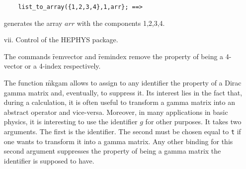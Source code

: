\begin{itemize}
\begin{verbatim}
    list_to_array({1,2,3,4},1,arr}; ==> 
\end{verbatim}
generates the array $arr$ with the components 1,2,3,4.
\item[vii.] Control of the \textsc{HEPHYS} package.  

\hypertarget{command:REMVECTOR}{}
\hypertarget{command:REMINDEX}{}
The commands \f{remvector} and \f{remindex} remove the property of 
being a 4-vector or a 4-index respectively. 

\hypertarget{operator:MKGAM}{}
The function \f{mkgam} allows to assign to any identifier the property 
of a Dirac gamma matrix and, eventually, to suppress it. Its interest lies 
in the fact that, during a calculation, it is often useful to transform 
a gamma matrix into an abstract operator and vice-versa. Moreover, in many 
applications in basic physics, it is interesting to use the identifier $g$ 
for other purposes.  
It takes two arguments. The first is the identifier. The second must be 
chosen equal to \texttt{t} if one wants to transform it into a gamma matrix. Any
other binding for this second argument suppresses the property of being 
a gamma matrix the identifier is supposed to have. 
\end{itemize}
